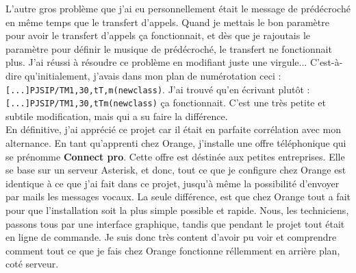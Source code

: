 \documentclass[12pt, a4paper]{article}
\begin{document}
L'autre gros problème que j'ai eu personnellement était le message de prédécroché
en même temps que le transfert d'appels. Quand je mettais le bon paramètre pour 
avoir le transfert d'appels ça fonctionnait, et dès que je rajoutais le 
paramètre pour définir le musique de prédécroché, le transfert ne fonctionnait
plus. J'ai réussi à résoudre ce problème en modifiant juste une virgule... 
C'est-à-dire qu'initialement, j'avais dans mon plan de numérotation ceci :\\
\texttt{[...]PJSIP/TM1,30,tT,m(newclass)}. J'ai trouvé qu'en écrivant
plutôt :\\ \texttt{[...]PJSIP/TM1,30,tTm(newclass)} ça fonctionnait.
C'est une très petite et subtile modification, mais qui a su faire la différence.\\

En définitive, j'ai apprécié ce projet car il était en parfaite corrélation avec
mon alternance. En tant qu'apprenti chez Orange, j'installe une offre téléphonique
qui se prénomme \textbf{Connect pro}. Cette offre est déstinée aux petites entreprises.
Elle se base sur un serveur Asterisk, et donc, tout ce que je configure chez Orange
est identique à ce que j'ai fait dans ce projet, jusqu'à même la possibilité
d'envoyer par mails les messages vocaux. La seule différence, est que chez Orange
tout a fait pour que l'installation soit la plus simple possible et rapide. 
Nous, les techniciens, passons tous par une interface graphique, tandis que 
pendant le projet tout était en ligne de commande. Je suis donc très 
content d'avoir pu voir et comprendre comment tout ce que je fais chez Orange fonctionne
réllemment en arrière plan, coté serveur. 
\end{document}

